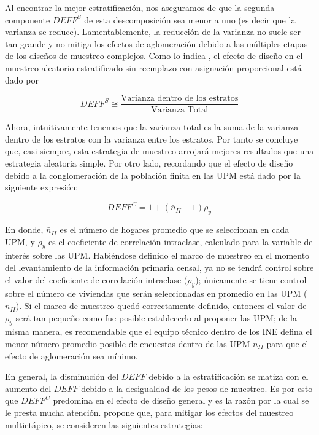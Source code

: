 \documentclass[
  12pt,
]{book}
\begin{document}
Al encontrar la mejor estratificación, nos aseguramos de que la segunda componente \(DEFF^S\) de esta descomposición sea menor a uno (es decir que la varianza se reduce). Lamentablemente, la reducción de la varianza no suele ser tan grande y no mitiga los efectos de aglomeración debido a las múltiples etapas de los diseños de muestreo complejos. Como lo indica \citet{Gutierrez_2016}, el efecto de diseño en el muestreo aleatorio estratificado sin reemplazo con asignación proporcional está dado por

\[
DEFF^S \cong\frac{\text{Varianza dentro de los estratos}}{\text{Varianza Total}}
\]

Ahora, intuitivamente tenemos que la varianza total es la suma de la varianza dentro de los estratos con la varianza entre los estratos. Por tanto se concluye que, casi siempre, esta estrategia de muestreo arrojará mejores resultados que una estrategia aleatoria simple. Por otro lado, recordando que el efecto de diseño debido a la conglomeración de la población finita en las UPM está dado por la siguiente expresión:

\[
DEFF^C = 1 + (\bar{n}_{II}-1)\rho_y
\]

En donde, \(\bar{n}_{II}\) es el número de hogares promedio que se seleccionan en cada UPM, y \(\rho_y\) es el coeficiente de correlación intraclase, calculado para la variable de interés sobre las UPM. Habiéndose definido el marco de muestreo en el momento del levantamiento de la información primaria censal, ya no se tendrá control sobre el valor del coeficiente de correlación intraclase (\(\rho_y\)); únicamente se tiene control sobre el número de viviendas que serán seleccionadas en promedio en las UPM (\(\bar{n}_{II}\)). Si el marco de muestreo quedó correctamente definido, entonces el valor de \(\rho_y\) será tan pequeño como fue posible establecerlo al proponer las UPM; de la misma manera, es recomendable que el equipo técnico dentro de los INE defina el menor número promedio posible de encuestas dentro de las UPM \(\bar{n}_{II}\) para que el efecto de aglomeración sea mínimo.

En general, la disminución del \(DEFF\) debido a la estratificación se matiza con el aumento del \(DEFF\) debido a la desigualdad de los pesos de muestreo. Es por esto que \(DEFF^C\) predomina en el efecto de diseño general y es la razón por la cual se le presta mucha atención. \citet{United_Nations_2008} propone que, para mitigar los efectos del muestreo multietápico, se consideren las siguientes estrategias:
\end{document}
